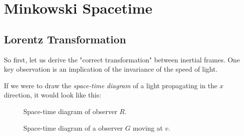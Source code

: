 \section{Minkowski Spacetime}
\subsection{Lorentz Transformation}
So first, let us derive the "correct transformation" between inertial frames.
One key observation is an implication of the invariance of the speed of light.

If we were to draw the \emph{space-time diagram} of a light propagating in the $x$ direction, it would look like this:
\begin{figure}[htbp]
  \begin{minipage}{0.45\textwidth}
    \centering
    \caption{Space-time diagram of observer $R$.}
    \label{fig:light-propagation1}
  \end{minipage}
  \begin{minipage}{0.45\textwidth}
    \centering
    \caption{Space-time diagram of a observer $G$ moving at $v$.}
    \label{fig:light-propagation2}
  \end{minipage}
\end{figure}

